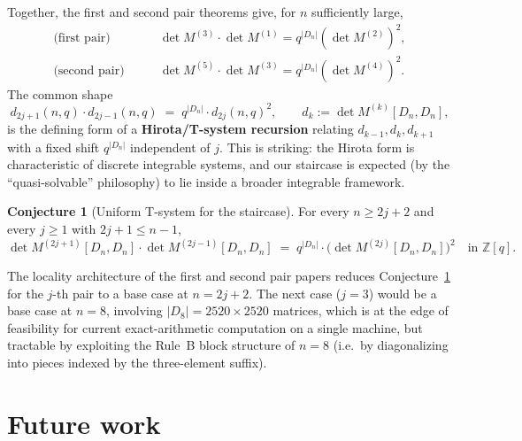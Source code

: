 \documentclass[11pt]{article}
\theoremstyle{definition}
\newtheorem{conjecture}[theorem]{Conjecture}
\begin{document}
Together, the first and second pair theorems give, for $n$ sufficiently large,
\begin{align*}
\text{(first pair)} \qquad & \det M^{(3)} \cdot \det M^{(1)} = q^{|D_n|} (\det M^{(2)})^2, \\
\text{(second pair)} \qquad & \det M^{(5)} \cdot \det M^{(3)} = q^{|D_n|} (\det M^{(4)})^2.
\end{align*}
The common shape
\[
d_{2j+1}(n, q) \cdot d_{2j-1}(n, q) \;=\; q^{|D_n|} \cdot d_{2j}(n, q)^2,
\qquad d_k := \det M^{(k)}[D_n, D_n],
\]
is the defining form of a \textbf{Hirota/T-system recursion} relating $d_{k-1}, d_k, d_{k+1}$
with a fixed shift $q^{|D_n|}$ independent of $j$. This is striking: the
Hirota form is characteristic of discrete integrable systems, and our
staircase is expected (by the ``quasi-solvable'' philosophy) to lie inside
a broader integrable framework.

\begin{conjecture}[Uniform T-system for the staircase]
\label{conj:tsystem}
For every $n \geq 2j+2$ and every $j \geq 1$ with $2j+1 \leq n-1$,
\[
\det M^{(2j+1)}[D_n, D_n] \cdot \det M^{(2j-1)}[D_n, D_n]
\;=\; q^{|D_n|} \cdot \bigl(\det M^{(2j)}[D_n, D_n]\bigr)^2
\quad \text{in } \mathbb{Z}[q].
\]
\end{conjecture}

The locality architecture of the first and second pair papers reduces
Conjecture~\ref{conj:tsystem} for the $j$-th pair to a base case at $n = 2j+2$.
The next case ($j=3$) would be a base case at $n = 8$, involving
$|D_8| = 2520 \times 2520$ matrices, which is at the edge of feasibility for
current exact-arithmetic computation on a single machine, but tractable by
exploiting the Rule~B block structure of $n=8$ (i.e.\ by diagonalizing into
pieces indexed by the three-element suffix).

\section{Future work}
\label{sec:future}
\end{document}
